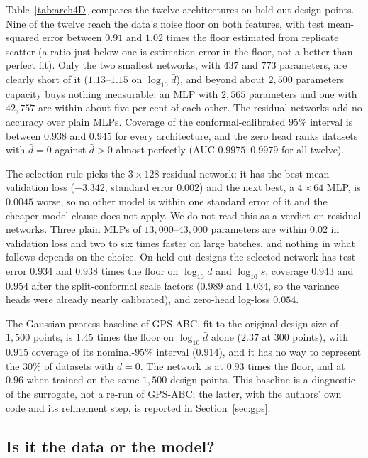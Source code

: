 \documentclass[sn-basic,iicol,pdflatex]{sn-jnl}
\begin{document}
Table~\ref{tab:arch4D} compares the twelve architectures on held-out design points.
Nine of the twelve reach the data's noise floor on both features, with test
mean-squared error between $0.91$ and $1.02$ times the floor estimated from replicate scatter
(a ratio just below one is estimation error in the floor, not a better-than-perfect
fit). Only the two smallest networks, with $437$ and $773$ parameters, are clearly short of it
($1.13$--$1.15$ on $\log_{10}\bar d$), and beyond about $2{,}500$ parameters
capacity buys nothing measurable: an MLP with $2{,}565$ parameters and one with
$42{,}757$ are within about five per cent of each other. The residual networks add no accuracy
over plain MLPs. Coverage of the conformal-calibrated $95\%$ interval is between
$0.938$ and $0.945$ for every architecture, and the zero head ranks datasets with
$\bar d=0$ against $\bar d>0$ almost perfectly (AUC $0.9975$--$0.9979$ for all twelve).

The selection rule picks the $3\times128$ residual network: it has the best mean validation loss
($-3.342$, standard error $0.002$) and the next best, a $4\times64$ MLP, is $0.0045$ worse,
so no other model is within one standard error of it and the cheaper-model clause does not apply. We do not read this as a verdict on residual
networks. Three plain MLPs of $13{,}000$--$43{,}000$ parameters are within $0.02$ in
validation loss and two to six times faster on large batches, and nothing in what follows
depends on the choice. On held-out designs the selected network has test error
$0.934$ and $0.938$ times the floor on $\log_{10}\bar d$ and $\log_{10}s$, coverage
$0.943$ and $0.954$ after the split-conformal scale factors ($0.989$ and $1.034$, so the variance
heads were already nearly calibrated), and zero-head log-loss $0.054$.

The Gaussian-process baseline of GPS-ABC, fit to the original design size of $1{,}500$ points, is $1.45$ times the
floor on $\log_{10}\bar d$ alone ($2.37$ at $300$ points), with $0.915$ coverage of its nominal-$95\%$
interval ($0.914$), and it has no way to represent the $30\%$ of datasets with $\bar d=0$. The network is at $0.93$
times the floor, and at $0.96$ when trained on the same $1{,}500$ design points. This
baseline is a diagnostic of the surrogate, not a re-run of GPS-ABC; the latter, with the
authors' own code and its refinement step, is reported in Section~\ref{sec:gps}.

\subsection{Is it the data or the model?}
\label{sec:matched}
\end{document}
